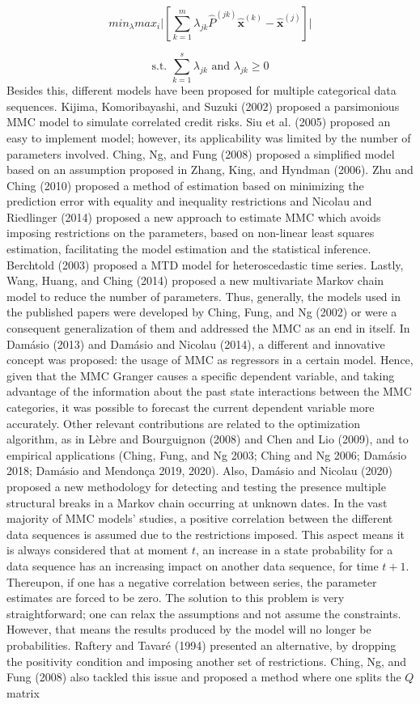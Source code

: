 \begin{equation}
min_{\lambda} max_{i} \vert [  \sum_{k=1}^m \lambda_{jk} \widehat{P}^{(jk)} \widehat{\boldsymbol{x}}^{(k)} - \widehat{\boldsymbol{x}}^{(j)}  ] \vert
\label{eq:eq3}
\end{equation}

\[ \text{s.t. } \sum_{k=1}^s \lambda_{jk} \text{ and } \lambda_{jk}  \geq 0 \] Besides this, different models have been proposed for multiple categorical data sequences. Kijima, Komoribayashi, and Suzuki (2002) proposed a parsimonious MMC model to simulate correlated credit risks. Siu et al. (2005) proposed an easy to implement model; however, its applicability was limited by the number of parameters involved. Ching, Ng, and Fung (2008) proposed a simplified model based on an assumption proposed in Zhang, King, and Hyndman (2006). Zhu and Ching (2010) proposed a method of estimation based on minimizing the prediction error with equality and inequality restrictions and Nicolau and Riedlinger (2014) proposed a new approach to estimate MMC which avoids imposing restrictions on the parameters, based on non-linear least squares estimation, facilitating the model estimation and the statistical inference. Berchtold (2003) proposed a MTD model for heteroscedastic time series. Lastly, Wang, Huang, and Ching (2014) proposed a new multivariate Markov chain model to reduce the number of parameters. Thus, generally, the models used in the published papers were developed by Ching, Fung, and Ng (2002) or were a consequent generalization of them and addressed the MMC as an end in itself. In Damásio (2013) and Damásio and Nicolau (2014), a different and innovative concept was proposed: the usage of MMC as regressors in a certain model. Hence, given that the MMC Granger causes a specific dependent variable, and taking advantage of the information about the past state interactions between the MMC categories, it was possible to forecast the current dependent variable more accurately. Other relevant contributions are related to the optimization algorithm, as in Lèbre and Bourguignon (2008) and Chen and Lio (2009), and to empirical applications (Ching, Fung, and Ng 2003; Ching and Ng 2006; Damásio 2018; Damásio and Mendonça 2019, 2020). Also, Damásio and Nicolau (2020) proposed a new methodology for detecting and testing the presence multiple structural breaks in a Markov chain occurring at unknown dates. In the vast majority of MMC models' studies, a positive correlation between the different data sequences is assumed due to the restrictions imposed. This aspect means it is always considered that at moment \(t\), an increase in a state probability for a data sequence has an increasing impact on another data sequence, for time \(t+1\). Thereupon, if one has a negative correlation between series, the parameter estimates are forced to be zero. The solution to this problem is very straightforward; one can relax the assumptions and not assume the constraints. However, that means the results produced by the model will no longer be probabilities. Raftery and Tavaré (1994) presented an alternative, by dropping the positivity condition and imposing another set of restrictions. Ching, Ng, and Fung (2008) also tackled this issue and proposed a method where one splits the \(Q\) matrix 